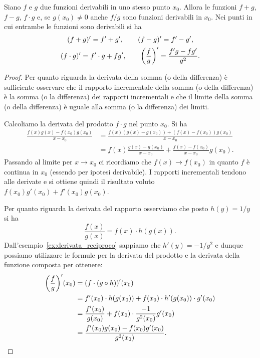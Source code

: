 \begin{theorem}
\mymark{***}
Siano $f$ e $g$ due funzioni derivabili in uno stesso punto $x_0$.
Allora le funzioni $f+g$, $f-g$, $f\cdot g$ e, se $g(x_0)\neq 0$ anche $f/g$ sono funzioni derivabili in $x_0$. Nei punti in cui entrambe le funzioni sono derivabili si ha
\begin{gather*}
  (f+g)' = f' + g', \qquad
  (f-g)' = f' - g', \\
  (f\cdot g)' = f' \cdot g + f g', \qquad
  {\left( \frac{f}{g} \right)}' = \frac{f'g - fg'}{g^2}.
\end{gather*}
\end{theorem}
%
\begin{proof}
\mymark{***}
Per quanto riguarda la derivata della somma (o della differenza) è sufficiente osservare che il rapporto incrementale della somma (o della differenza) è la somma (o la differenza) dei rapporti incrementali e che il limite della somma (o della differenza) è uguale alla somma (o la differenza) dei limiti.

Calcoliamo la derivata del prodotto $f\cdot g$ nel punto $x_0$. Si ha
\begin{align*}
  \frac{f(x)g(x) - f(x_0)g(x_0)}{x-x_0}
  &= \frac{f(x)(g(x) - g(x_0)) + (f(x)-f(x_0))g(x_0)}{x-x_0}\\
  &= f(x) \frac{g(x)-g(x_0)}{x-x_0} + \frac{f(x)-f(x_0)}{x-x_0} g(x_0).
\end{align*}
Passando al limite per $x\to x_0$ ci ricordiamo che $f(x)\to f(x_0)$ in quanto $f$ è continua in $x_0$ (essendo per ipotesi derivabile). I rapporti incrementali tendono alle derivate e si ottiene quindi il risultato voluto $f(x_0) g'(x_0) + f'(x_0) g(x_0)$.

Per quanto riguarda la derivata del rapporto osserviamo che
posto $h(y)=1/y$ si ha
\[
  \frac{f(x)}{g(x)} = f(x) \cdot h(g(x)).
\]
Dall'esempio~\ref{ex:derivata_reciproco} sappiamo che $h'(y) = -1/y^2$ e dunque
possiamo utilizzare le formule per la derivata del prodotto e la derivata della funzione composta per ottenere:
\begin{align*}
  {\left( \frac{f}{g} \right)}'(x_0)
  &= {\left( f \cdot (g\circ h) \right)}'(x_0) \\
  &= f'(x_0) \cdot h(g(x_0)) + f(x_0) \cdot h'(g(x_0))\cdot g'(x_0)\\
  &= \frac{f'(x_0)}{g(x_0)} + f(x_0) \cdot \frac{-1}{g^2(x_0)} g'(x_0)\\
  &= \frac{f'(x_0)g(x_0) - f(x_0)g'(x_0)}{g^2(x_0)}.
\end{align*}
\end{proof}

